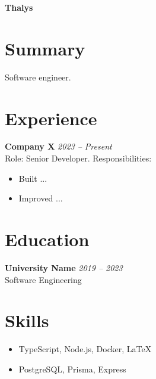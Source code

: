 



{\LARGE \textbf{Thalys}}\\
\vspace{2mm}


\section*{Summary}
Software engineer. \newline


\section*{Experience}
\textbf{Company X} \hfill \textit{2023 -- Present}\\
Role: Senior Developer. Responsibilities:
\begin{itemize}
\item Built ...
\item Improved ...
\end{itemize}


\section*{Education}
\textbf{University Name} \hfill \textit{2019 -- 2023}\\
Software Engineering


\section*{Skills}
\begin{itemize}
\item TypeScript, Node.js, Docker, LaTeX
\item PostgreSQL, Prisma, Express
\end{itemize}


